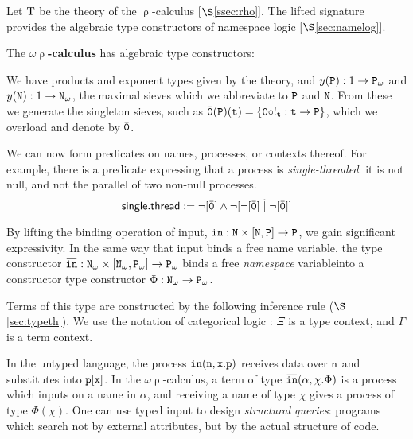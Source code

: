 \documentclass[stthol.tex]{subfiles}
\begin{document}
Let $\mathrm{T}$ be the theory of the $\uprho$-calculus [$\S$\ref{ssec:rho}]. The lifted signature provides the algebraic type constructors of namespace logic [$\S$\ref{sec:namelog}].
\begin{definition} The \textbf{$\omega\uprho$-calculus} has algebraic type constructors:
\end{definition}

We have products and exponent types given by the theory, and $y(\mathtt{P}):1\to \mathtt{P}_\omega$ and $y(\mathtt{N}):1\to \mathtt{N}_\omega$, the maximal sieves which we abbreviate to $\mathtt{P}$ and $\mathtt{N}$. From these we generate the singleton sieves, such as $\ob{\ttz}(\PP)(\ttt)=\{\ttz\circ!_\ttt:\ttt\to \PP\}$, which we overload and denote by $\ob{\ttz}$.

We can now form predicates on names, processes, or contexts thereof. For example, there is a predicate expressing that a process is \textit{single-threaded}: it is not null, and not the parallel of two non-null processes.
$$\msf{single.thread} := \neg[\ob{\ttz}]\land \neg[\neg[\ob{\ttz}]\obttp \neg[\ob{\ttz}]]$$

By lifting the binding operation of input, $\mathtt{in}:\mathtt{N}\times [\mathtt{N},\mathtt{P}]\to \mathtt{P}$, we gain significant expressivity. In the same way that input binds a free name variable, the type constructor $\ob{\tti}:\N_\omega\times [\N_\omega, \PP_\omega] \to \PP_\omega$ binds a free \textit{namespace} variableinto a constructor type constructor $\Phi:\mathtt{N}_\omega\to \mathtt{P}_\omega$.

Terms of this type are constructed by the following inference rule ($\S$\ref{sec:typeth}). We use the notation of categorical logic \cite{jacobs}: $\Xi$ is a type context, and $\Gamma$ is a term context.


In the untyped language, the process $\mathtt{in}(\mathtt{n},\mathtt{x}.\mathtt{p})$ receives data over $\mathtt{n}$ and substitutes into $\mathtt{p}[\mathtt{x}]$. In the $\omega\uprho$-calculus, a term of type $\ob{\tti}(\alpha,\chi.\Phi)$ is a process which inputs on a name in $\alpha$, and receiving a name of type $\chi$ gives a process of type $\Phi(\chi)$. One can use typed input to design \textit{structural queries}: programs which search not by external attributes, but by the actual structure of code.

\end{document}
